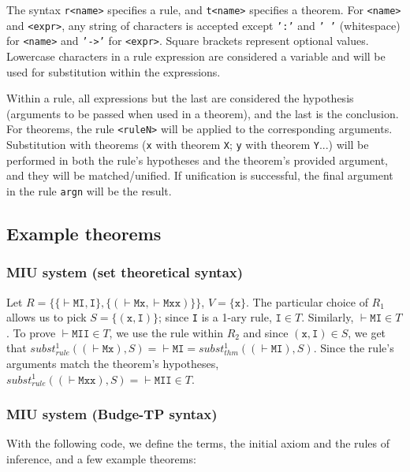 \documentclass{article}
\begin{document}
The syntax \texttt{r<name>} specifies a rule, and \texttt{t<name>} specifies a theorem. For \texttt{<name>} and \texttt{<expr>}, any string of characters is accepted except \texttt{':'} and \texttt{' '} (whitespace) for \texttt{<name>} and \texttt{'->'} for \texttt{<expr>}. Square brackets represent optional values. Lowercase characters in a rule expression are considered a variable and will be used for substitution within the expressions.

Within a rule, all expressions but the last are considered the hypothesis (arguments to be passed when used in a theorem), and the last is the conclusion. For theorems, the rule \texttt{<ruleN>} will be applied to the corresponding arguments. Substitution with theorems (\texttt{x} with theorem \texttt{X}; \texttt{y} with theorem \texttt{Y}...) will be performed in both the rule's hypotheses and the theorem's provided argument, and they will be matched/unified. If unification is successful, the final argument in the rule \texttt{argn} will be the result.

\subsection{Example theorems}

\subsubsection{MIU system\cite{b1} (set theoretical syntax)}

Let $R = \{ \{ \vdash\texttt{MI}, \texttt{I} \}, \{ (\vdash\texttt{Mx}, \vdash\texttt{Mxx}) \} \}$, $V = \{ \texttt{x} \}$. The particular choice of $R_1$ allows us to pick $S = \{ (\texttt{x}, \texttt{I}) \}$; since \texttt{I} is a 1-ary rule, $\texttt{I} \in T$. Similarly, $\vdash \texttt{MI} \in T$. To prove $\vdash\texttt{MII} \in T$, we use the rule within $R_2$ and since $(\texttt{x}, \texttt{I}) \in S$, we get that $subst_{rule}^1((\vdash\texttt{Mx}), S) = \vdash\texttt{MI} = subst_{thm}^1((\vdash\texttt{MI}), S)$. Since the rule's arguments match the theorem's hypotheses, $subst_{rule}^1((\vdash\texttt{Mxx}), S) = \vdash\texttt{MII} \in T$.

\subsubsection{MIU system (Budge-TP syntax)}

With the following code, we define the terms, the initial axiom and the rules of inference, and a few example theorems:
\end{document}
